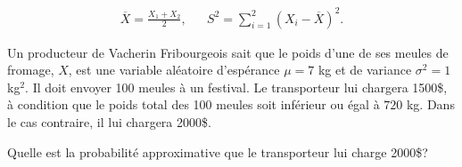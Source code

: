 \begin{questions}
\begin{align*}
    \overline{X}=\displaystyle \frac{X_1+X_2}{2}, & & S^2=\sum_{i=1}^2(X_i-\overline{X})^2.
\end{align*}

\newpage

\question[8]
Un producteur de Vacherin Fribourgeois sait que le poids d'une de ses meules de fromage, $X$, est une variable aléatoire d'espérance $\mu=7$ kg et de variance $\sigma^2 = 1$ kg$^2$. Il doit envoyer 100 meules à un festival. Le transporteur lui chargera 1500\$, à condition que le poids total des 100 meules soit inférieur ou égal à $720$ kg. Dans le cas contraire, il lui chargera 2000\$.

Quelle est la probabilité approximative que le transporteur lui charge 2000\$?
    \vspace{12cm}

\end{questions}

 

